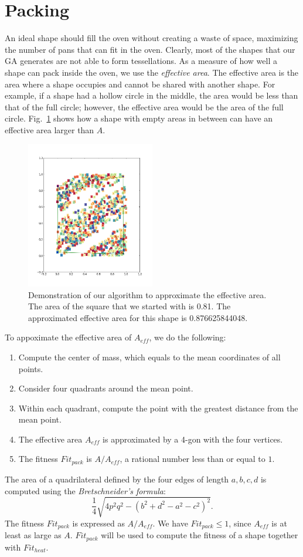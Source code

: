 \documentclass[12pt]{reedmcm}
\begin{document}
\section{Packing}
\label{sec:packing}
An ideal shape should fill the oven without creating a waste of space, maximizing the number of pans that can fit in the oven.
Clearly, most of the shapes that our GA generates are not able to form tessellations.
As a measure of how well a shape can pack inside the oven, we use the \textit{effective area}.
The effective area is the area where a shape occupies and cannot be shared with another shape.
For example, if a shape had a hollow circle in the middle, the area would be less than that of the full circle; however, the effective area would be the area of the full circle.
Fig.~\ref{fig:effarea} shows how a shape with empty areas in between can have an effective area larger than $A$.
\begin{figure}[h!]
  \centering
  \includegraphics[width=0.5\textwidth]{area_approx}
  \caption{Demonstration of our algorithm to approximate the effective area.
  The area of the square that we started with is 0.81.
  The approximated effective area for this shape is 0.876625844048.}
  \label{fig:effarea}
\end{figure}
%
To appoximate the effective area of $A_{eff}$, we do the following:
\begin{enumerate}
  \item Compute the center of mass, which equals to the mean coordinates of all points.
  \item Consider four quadrants around the mean point.
  \item Within each quadrant, compute the point with the greatest distance from the mean point.
  \item The effective area $A_{eff}$ is approximated by a 4-gon with the four vertices.
  \item The fitness $Fit_{pack}$ is $A/A_{eff}$, a rational number less than or equal to $1$.
\end{enumerate}
The area of a quadrilateral defined by the four edges of length $a,b,c,d$ is computed using the \textit{Bretschneider's formula}:
\begin{equation*}
  \frac{1}{4}\sqrt{4p^2 q^2 - (b^2 + d^2 - a^2 - c^2)^2}.
\end{equation*}
The fitness $Fit_{pack}$ is expressed as $A/A_{eff}$.
We have $Fit_{pack} \leq 1$, since $A_{eff}$ is at least as large as $A$.
$Fit_{pack}$ will be used to compute the fitness of a shape together with $Fit_{heat}$.
\end{document}
